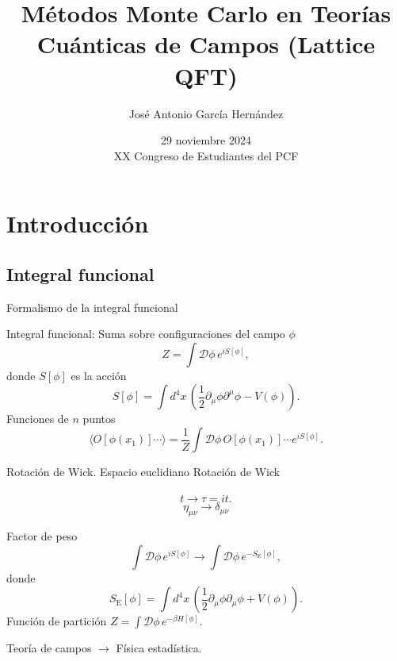 \documentclass[11pt]{beamer}
\author{José Antonio García Hernández}
\title{Métodos Monte Carlo en Teorías Cuánticas de Campos (Lattice QFT)}
\institute{Instituto de Ciencias Nucleares, UNAM}
\date{29 noviembre 2024 \\ XX Congreso de Estudiantes del PCF}
\begin{document}
\begin{frame}
\titlepage
\end{frame}


\section{Introducción}
\subsection{Integral funcional}
\begin{frame}{Formalismo de la integral funcional}

    Integral funcional: Suma sobre configuraciones del campo $\phi$
    $$Z = \int \mathcal{D}\phi \, e^{iS[\phi]},$$
    donde $S[\phi]$ es la acción%
    $$ S[\phi] = \int d^4 x \, \left( \frac{1}{2}\partial_{\mu}\phi \partial^{\mu}\phi - V(\phi)\right).$$
    Funciones de $n$ puntos
    $$ \langle O[\phi(x_1)] \cdots \rangle =  \frac{1}{Z}\int \mathcal{D}\phi \, O[\phi(x_1)]\cdots e^{iS[\phi]}.$$
\end{frame}

\begin{frame}{Rotación de Wick. Espacio euclidiano}
    Rotación de Wick \\~
    $$ t \to \tau = i t.$$
    $$ \eta_{\mu\nu} \to \delta_{\mu\nu}$$
        
    Factor de peso 
        $$ \int \mathcal{D}\phi \, e^{iS[\phi]} \to  \int \mathcal{D}\phi \, e^{-S_{\text{E}}[\phi]},$$
        donde 
        $$ S_{\text{E}}[\phi] = \int d^4 x \, \left( \frac{1}{2}\partial_{\mu}\phi \partial_{\mu}\phi + V(\phi)\right).$$
        Función de partición $ Z = \int \mathcal{D}\phi\, e^{-\beta H[\phi]}$.
        
        Teoría de campos $\to$ Física estadística. 
\end{frame}
\end{document}
